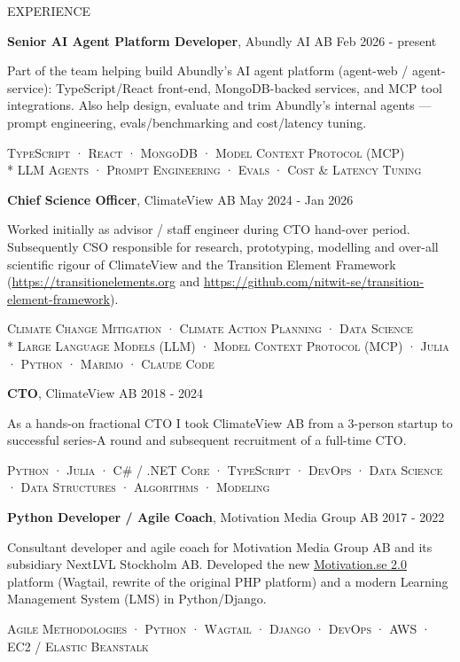 \documentclass{resume} %
\newcommand{\PRLsep}{\noindent\makebox[\linewidth]{\resizebox{0.1\linewidth}{0.25pt}{$\bullet$}}}
\newcommand{\rExperience}[5]{
  \noindent\begin{minipage}[t]{\linewidth}
    \textbf{#1}, #2 \hfill #3

    #4

    \begin{center} \textsc{\scriptsize #5 } \end{center}
  \end{minipage}
}
\begin{document}
\begin{rSection}{EXPERIENCE}

  {\rExperience
      {Senior AI Agent Platform Developer} {Abundly AI AB} {Feb 2026 - present}
      {
        Part of the team helping build Abundly's AI agent platform (agent-web / agent-service): TypeScript/React front-end, MongoDB-backed services, and MCP tool integrations. Also help design, evaluate and trim Abundly's internal agents --- prompt engineering, evals/benchmarking and cost/latency tuning.
      }
      {TypeScript · React · MongoDB · Model Context Protocol (MCP) \\*
        LLM Agents · Prompt Engineering · Evals · Cost \& Latency Tuning}
  }

  \PRLsep

  {\rExperience
      {Chief Science Officer} {ClimateView AB} {May 2024 - Jan 2026}
      {
        Worked initially as advisor / staff engineer during CTO hand-over period. Subsequently CSO responsible for research, prototyping, modelling and over-all scientific rigour of ClimateView and the Transition Element Framework (\href{https://transitionelements.org}{https://transitionelements.org} and \href{https://github.com/nitwit-se/transition-element-framework}{https://github.com/nitwit-se/transition-element-framework}).
      }
      {Climate Change Mitigation · Climate Action Planning · Data Science  \\*
        Large Language Models (LLM) · Model Context Protocol (MCP) · Julia · Python  · Marimo · Claude Code}
  }

  \PRLsep

  {\rExperience
    {CTO} {ClimateView AB} {2018 - 2024}
    {As a hands-on fractional CTO I took ClimateView AB from a 3-person startup to successful series-A round and subsequent recruitment of a full-time CTO.}
    {Python · Julia · C\# / .NET Core · TypeScript · DevOps · Data Science · Data Structures · Algorithms · Modeling}
  }

  \PRLsep

  {\rExperience
    {Python Developer / Agile Coach} {Motivation Media Group AB} {2017 - 2022}
    {Consultant developer and agile coach for Motivation Media Group AB and its subsidiary NextLVL Stockholm AB. Developed the new \href{https://motivation.se}{Motivation.se 2.0} platform (Wagtail, rewrite of the original PHP platform) and a modern Learning Management System (LMS) in Python/Django.}
    {Agile Methodologies · Python · Wagtail · Django · DevOps · AWS · EC2 / Elastic Beanstalk}
  }


\end{rSection}
\end{document}
